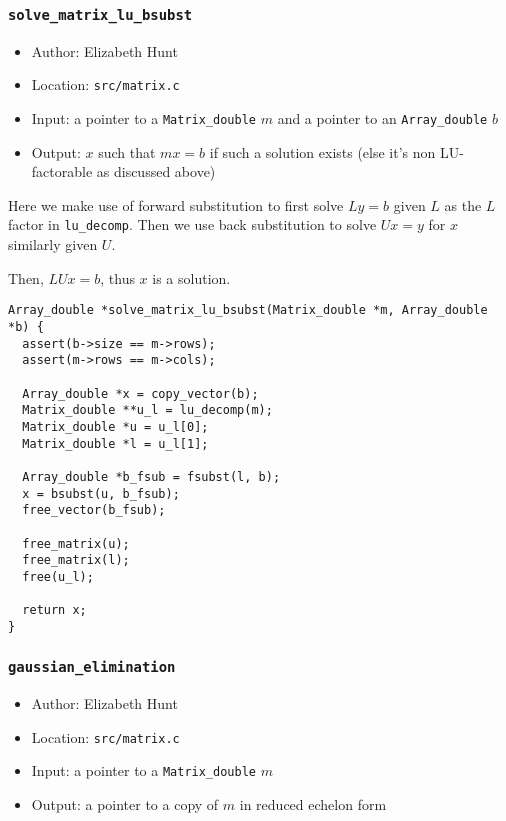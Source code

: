 \documentclass[11pt]{article}
\begin{document}
\subsubsection{\texttt{solve\_matrix\_lu\_bsubst}}
\label{sec:orga735557}
\begin{itemize}
\item Author: Elizabeth Hunt
\item Location: \texttt{src/matrix.c}
\item Input: a pointer to a \texttt{Matrix\_double} \(m\) and a pointer to an \texttt{Array\_double} \(b\)
\item Output: \(x\) such that \(mx = b\) if such a solution exists (else it's non LU-factorable as discussed
above)
\end{itemize}

Here we make use of forward substitution to first solve \(Ly = b\) given \(L\) as the \(L\) factor in
\texttt{lu\_decomp}. Then we use back substitution to solve \(Ux = y\) for \(x\) similarly given \(U\).

Then, \(LUx = b\), thus \(x\) is a solution.

\begin{verbatim}
Array_double *solve_matrix_lu_bsubst(Matrix_double *m, Array_double *b) {
  assert(b->size == m->rows);
  assert(m->rows == m->cols);

  Array_double *x = copy_vector(b);
  Matrix_double **u_l = lu_decomp(m);
  Matrix_double *u = u_l[0];
  Matrix_double *l = u_l[1];

  Array_double *b_fsub = fsubst(l, b);
  x = bsubst(u, b_fsub);
  free_vector(b_fsub);

  free_matrix(u);
  free_matrix(l);
  free(u_l);

  return x;
}
\end{verbatim}

\subsubsection{\texttt{gaussian\_elimination}}
\label{sec:org71d2519}
\begin{itemize}
\item Author: Elizabeth Hunt
\item Location: \texttt{src/matrix.c}
\item Input: a pointer to a \texttt{Matrix\_double} \(m\)
\item Output: a pointer to a copy of \(m\) in reduced echelon form
\end{itemize}
\end{document}
